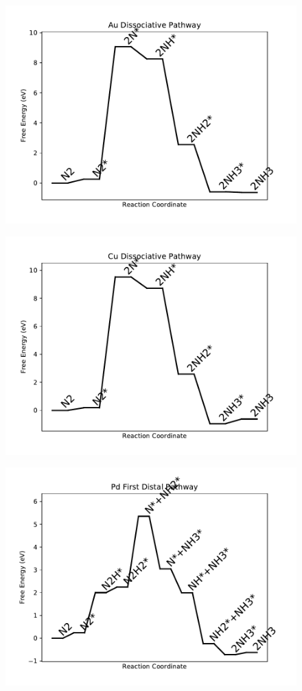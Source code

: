 \begin{figure}
\includegraphics[width=0.8\linewidth]{data/plots/Au_dissociative.pdf}
\end{figure}

\begin{figure}
\includegraphics[width=0.8\linewidth]{data/plots/Cu_dissociative.pdf}
\end{figure}

\begin{figure}
\includegraphics[width=0.8\linewidth]{data/plots/Pd_distal_1.pdf}
\end{figure}

